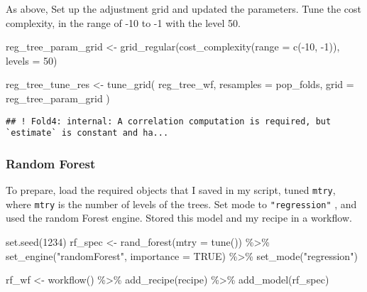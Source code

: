 \documentclass[
]{article}
\newenvironment{Shaded}{\begin{snugshade}}{\end{snugshade}}
\newcommand{\AttributeTok}[1]{\textcolor[rgb]{0.77,0.63,0.00}{#1}}
\newcommand{\ConstantTok}[1]{\textcolor[rgb]{0.00,0.00,0.00}{#1}}
\newcommand{\DecValTok}[1]{\textcolor[rgb]{0.00,0.00,0.81}{#1}}
\newcommand{\FunctionTok}[1]{\textcolor[rgb]{0.00,0.00,0.00}{#1}}
\newcommand{\NormalTok}[1]{#1}
\newcommand{\OtherTok}[1]{\textcolor[rgb]{0.56,0.35,0.01}{#1}}
\newcommand{\SpecialCharTok}[1]{\textcolor[rgb]{0.00,0.00,0.00}{#1}}
\newcommand{\StringTok}[1]{\textcolor[rgb]{0.31,0.60,0.02}{#1}}
\begin{document}
As above, Set up the adjustment grid and updated the parameters. Tune
the cost complexity, in the range of -10 to -1 with the level 50.

\begin{Shaded}
\begin{Highlighting}[]
\NormalTok{reg\_tree\_param\_grid }\OtherTok{\textless{}{-}} \FunctionTok{grid\_regular}\NormalTok{(}\FunctionTok{cost\_complexity}\NormalTok{(}\AttributeTok{range =} \FunctionTok{c}\NormalTok{(}\SpecialCharTok{{-}}\DecValTok{10}\NormalTok{, }\SpecialCharTok{{-}}\DecValTok{1}\NormalTok{)), }\AttributeTok{levels =} \DecValTok{50}\NormalTok{)}

\NormalTok{reg\_tree\_tune\_res }\OtherTok{\textless{}{-}} \FunctionTok{tune\_grid}\NormalTok{(}
\NormalTok{  reg\_tree\_wf, }
  \AttributeTok{resamples =}\NormalTok{ pop\_folds, }
  \AttributeTok{grid =}\NormalTok{ reg\_tree\_param\_grid}
\NormalTok{)}
\end{Highlighting}
\end{Shaded}

\begin{verbatim}
## ! Fold4: internal: A correlation computation is required, but `estimate` is constant and ha...
\end{verbatim}

\hypertarget{random-forest}{%
\subsubsection{Random Forest}\label{random-forest}}

To prepare, load the required objects that I saved in my script, tuned
\texttt{mtry}, where \texttt{mtry} is the number of levels of the trees.
Set mode to \texttt{"regression"} , and used the random Forest engine.
Stored this model and my recipe in a workflow.

\begin{Shaded}
\begin{Highlighting}[]
\FunctionTok{set.seed}\NormalTok{(}\DecValTok{1234}\NormalTok{)}
\NormalTok{rf\_spec }\OtherTok{\textless{}{-}} \FunctionTok{rand\_forest}\NormalTok{(}\AttributeTok{mtry =} \FunctionTok{tune}\NormalTok{()) }\SpecialCharTok{\%\textgreater{}\%}
  \FunctionTok{set\_engine}\NormalTok{(}\StringTok{"randomForest"}\NormalTok{, }\AttributeTok{importance =} \ConstantTok{TRUE}\NormalTok{) }\SpecialCharTok{\%\textgreater{}\%}
  \FunctionTok{set\_mode}\NormalTok{(}\StringTok{"regression"}\NormalTok{)}

\NormalTok{rf\_wf }\OtherTok{\textless{}{-}} \FunctionTok{workflow}\NormalTok{() }\SpecialCharTok{\%\textgreater{}\%}
  \FunctionTok{add\_recipe}\NormalTok{(recipe) }\SpecialCharTok{\%\textgreater{}\%}
  \FunctionTok{add\_model}\NormalTok{(rf\_spec)}
\end{Highlighting}
\end{Shaded}
\end{document}
